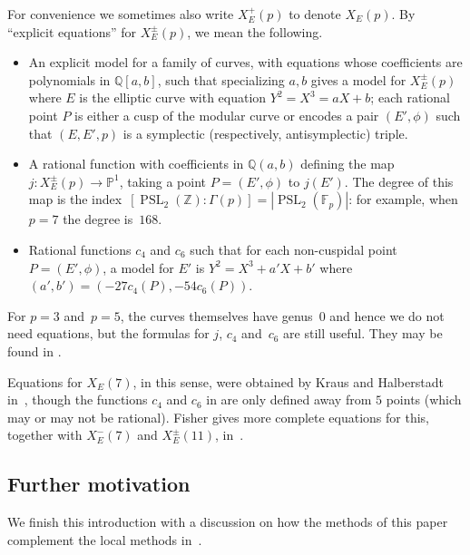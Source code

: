 \documentclass[12pt]{amsart}
\newcommand{\F}{\mathbb{F}}
\newcommand{\PP}{\mathbb{P}}
\newcommand{\Q}{\mathbb{Q}}
\newcommand{\Z}{\mathbb{Z}}
\newcommand{\PSL}{\operatorname{PSL}}
\numberwithin{equation}{section}
\theoremstyle{definition}
\theoremstyle{remark}
\begin{document}
For convenience 
we sometimes also write $X_E^+(p)$ to denote $X_E(p)$. 
By ``explicit equations'' for $X_E^{\pm}(p)$, we mean the
following.
\begin{itemize}
  \item An explicit model for a family of curves, with equations whose
    coefficients are polynomials in $\Q[a,b]$, such that specializing
    $a,b$ gives a model for $X_E^{\pm}(p)$ where $E$ is the elliptic
    curve with equation $Y^2=X^3=aX+b$; each rational point $P$ is
    either a cusp of the modular curve or encodes a pair $(E',\phi)$
    such that $(E,E', p)$ is a symplectic (respectively,
    antisymplectic) triple.
    \item A rational function with coefficients in $\Q(a,b)$ defining
      the map $j: X_E^{\pm}(p) \to \PP^1$, taking a point
      $P=(E',\phi)$ to $j(E')$.  The degree of this map is the
      index~$[\PSL_2(\Z):\Gamma(p)] = |\PSL_2(\F_p)|$: for example, when
        $p=7$ the degree is~$168$.
      \item Rational functions $c_4$ and $c_6$ such that for each
        non-cuspidal point~$P=(E',\phi)$, a model for $E'$ is
        $Y^2=X^3+a'X+b'$ where $(a',b')=(-27c_4(P),-54c_6(P))$.
\end{itemize}
For $p=3$ and~$p=5$, the curves themselves have genus~$0$ and hence we
do not need equations, but the formulas for $j$, $c_4$ and~$c_6$ are
still useful.  They may be found in \cite{Rubin-Silverberg}.

Equations for $X_E(7)$, in this sense, were obtained by Kraus and
Halberstadt in~\cite{Halberstadt-Kraus-XE7}, though the functions
$c_4$ and $c_6$ in \cite{Halberstadt-Kraus-XE7} are only defined away
from $5$ points (which may or may not be rational). Fisher gives more
complete equations for this, together with $X_E^-(7)$ and
$X_E^{\pm}(11)$, in~\cite{Fisher}.



\subsection{Further motivation} \label{S:motivation}
We finish this introduction with a discussion on how the methods of
this paper complement the local methods in~\cite{FKSym}.
\end{document}
